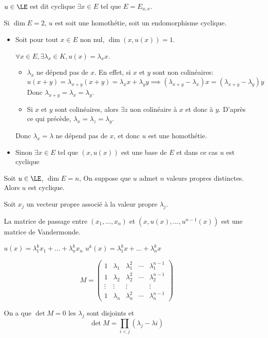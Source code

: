 \begin{definition}
	$u \in \LE$ est dit cyclique \ssi $\exists x \in E$ tel que $E = E_{u,x}$.
\end{definition}

\begin{exemple}
	Si $\dim E = 2$, $u$ est soit une homothétie, soit un endomorphisme cyclique.

	\begin{itemize}
		\item Soit pour tout $x \in E$ non nul, $\dim (x, u(x)) = 1$.

		      $\forall x \in E, \exists \lambda_x \in K, u(x) = \lambda_x x$.

		      \begin{itemize}
			      \item $\lambda_x$ ne dépend pas de $x$. En effet, si $x$ et $y$ sont non colinéaires:
			            $$ u (x+y) = \lambda_{x+y} (x+y) = \lambda_x x + \lambda_y y \implies (\lambda_{x+y} - \lambda_x) x = (\lambda_{x+y} - \lambda_y) y$$
			            Donc $\lambda_{x+y} = \lambda_x = \lambda_y$.

			      \item Si $x$ et $y$ sont colinéaires, alors $\exists z$ non colinéaire à $x$ et donc à $y$. D'après ce qui précède, $\lambda_x = \lambda_z = \lambda_y$.
		      \end{itemize}

		      Donc $\lambda_x = \lambda$ ne dépend pas de $x$, et donc $u$ est une homothétie.

		\item Sinon $\exists x \in E$ tel que $(x, u(x))$ est une base de $E$ et dans ce cas $u$ est cyclique
	\end{itemize}
\end{exemple}

\begin{exemple}
	Soit $u \in \LE$, $\dim E = n$, On suppose que $u$ admet $n$ valeurs propres distinctes. Alors $u$ est cyclique.

	Soit $x_j$ un vecteur propre associé à la valeur propre $\lambda_j$.

	La matrice de passage entre $(x_1, \dots, x_n)$ et $(x, u(x), \dots, u^{n-1}(x))$ est une matrice de Vandermonde.

	$u(x) = \lambda_1^k x_1 + \dots + \lambda_n^{k}x_n$
	$u^k(x) = \lambda_1^k x + \dots + \lambda_n^{k}x$

	\begin{equation*}
		M = \begin{pmatrix}
			1      & \lambda_1 & \lambda_1^2 & \cdots & \lambda_1^{n-1} \\
			1      & \lambda_2 & \lambda_2^2 & \cdots & \lambda_2^{n-1} \\
			\vdots & \vdots    & \vdots      &        & \vdots          \\
			1      & \lambda_n & \lambda_n^2 & \cdots & \lambda_n^{n-1}
		\end{pmatrix}
	\end{equation*}

	On a que $\det M = 0 $ \ssi les $\lambda_j$ sont disjoints et
	$$ \det M = \prod_{i < j} (\lambda_j-\lambda i)$$
\end{exemple}

